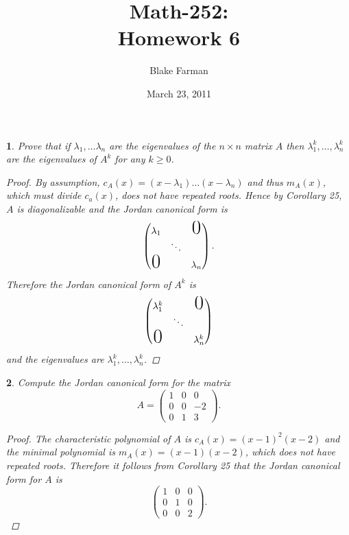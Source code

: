 \documentclass[10pt]{amsart}
\author{Blake Farman}
\title{Math-252:\\Homework 6}
\date{March 23, 2011}\pdfpagewidth 8.5in
\begin{document}
\maketitle

\newtheorem{thm}{}

\begin{thm}
  \label{Ex1}
  Prove that if $\lambda_1, \ldots \lambda_n$ are the eigenvalues of the $n \times n$ matrix $A$ then $\lambda_1^k, \ldots, \lambda_n^k$ are the eigenvalues of $A^k$ for any $k \geq 0$.
    \begin{proof}
    By assumption, $c_A(x) = (x - \lambda_1)\ldots(x - \lambda_n)$ and thus $m_A(x)$, which must divide $c_a(x)$, does not have repeated roots.
    Hence by Corollary 25, $A$ is diagonalizable and the Jordan canonical form is 
    $$
    \begin{pmatrix}
      \lambda_1  & & \text{\huge{0}}\\
       & \ddots & \\ 
      \text{\huge{0}} & & \lambda_n
    \end{pmatrix}.
    $$
    Therefore the Jordan canonical form of $A^k$ is 
    $$
    \begin{pmatrix}
      \lambda_1^k  & & \text{\huge{0}}\\
       & \ddots & \\ 
      \text{\huge{0}} & & \lambda_n^k
    \end{pmatrix}
    $$
    and the eigenvalues are $\lambda_1^k, \ldots, \lambda_n^k$.
  \end{proof}
\end{thm}

\begin{thm}
  \label{Ex2}
  Compute the Jordan canonical form for the matrix
  $$
  A =  \begin{pmatrix}
    1 & 0 & 0\\
    0 & 0 & -2\\
    0 & 1 & 3
  \end{pmatrix}.
  $$
  \begin{proof}
    The characteristic polynomial of $A$ is $c_A(x) = (x-1)^2(x-2)$ and the minimal polynomial is $m_A(x) = (x-1)(x-2)$, which does not have repeated roots.
    Therefore it follows from Corollary 25 that the Jordan canonical form for $A$ is 
    $$
    \begin{pmatrix}
      1 & 0 & 0\\
      0 & 1 & 0\\
      0 & 0 & 2
    \end{pmatrix}.
    $$
  \end{proof}
\end{thm}
\end{document}
